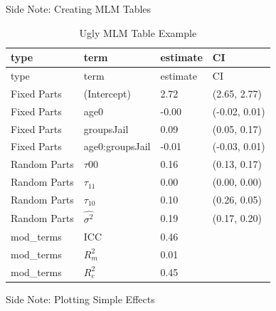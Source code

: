 \begin{frame}[fragile]{Side Note: Creating MLM Tables}

\small

\begin{Shaded}
\begin{Highlighting}[]
\NormalTok{(} \NormalTok{)}
\OperatorTok{::} \NormalTok{)}
\end{Highlighting}
\end{Shaded}

\begin{longtable}[]{@{}llll@{}}
\caption{Ugly MLM Table Example}\tabularnewline
\toprule
type & term & estimate & CI\tabularnewline
\midrule
\endfirsthead
\toprule
type & term & estimate & CI\tabularnewline
\midrule
\endhead
Fixed Parts & (Intercept) & 2.72 & (2.65, 2.77)\tabularnewline
Fixed Parts & age0 & -0.00 & (-0.02, 0.01)\tabularnewline
Fixed Parts & groupsJail & 0.09 & (0.05, 0.17)\tabularnewline
Fixed Parts & age0:groupsJail & -0.01 & (-0.03, 0.01)\tabularnewline
Random Parts & \(\tau{00}\) & 0.16 & (0.13, 0.17)\tabularnewline
Random Parts & \(\tau_{11}\) & 0.00 & (0.00, 0.00)\tabularnewline
Random Parts & \(\tau_{10}\) & 0.10 & (0.26, 0.05)\tabularnewline
Random Parts & \(\hat{\sigma^2}\) & 0.19 & (0.17, 0.20)\tabularnewline
mod\_terms & ICC & 0.46 &\tabularnewline
mod\_terms & \(R^2_m\) & 0.01 &\tabularnewline
mod\_terms & \(R^2_c\) & 0.45 &\tabularnewline
\bottomrule
\end{longtable}

\normalsize

\end{frame}

\begin{frame}[fragile]{Side Note: Plotting Simple Effects}

\footnotesize

\begin{Shaded}
\begin{Highlighting}[]
 \NormalTok{, }
 \NormalTok{, }
         \NormalTok{)}
\end{Highlighting}
\end{Shaded}

\end{frame}

